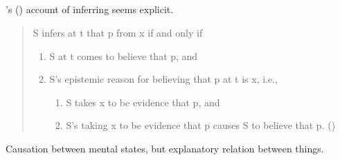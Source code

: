 \subsection{\textcite{Longino:1978wv}}

\begin{note}
  \citeauthor{Longino:1978wv}'s (\citeyear{Longino:1978wv}) account of inferring seems explicit.
  \begin{quote}
    S infers at t that p from x if and only if
    \begin{enumerate}[label=\arabic*]
    \item
      S at t comes to believe that p, and
    \item
      S's epistemic reason for believing that p at t is x, i.e.,
      \begin{enumerate}[label=\alph*]
      \item
        S takes x to be evidence that p, and
      \item
        S's taking x to be evidence that p causes S to believe that p.\newline
        \mbox{}\hfill\mbox{(\citeyear[22]{Longino:1978wv})}
      \end{enumerate}
    \end{enumerate}
  \end{quote}
  Causation between mental states, but explanatory relation between things.
\end{note}







